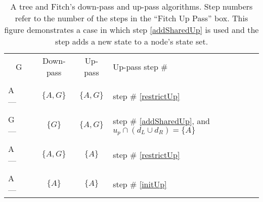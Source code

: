 \documentclass[11pt]{article}
\begin{document}
\begin{table}[htdp]
\caption{A tree and Fitch's down-pass and up-pass algorithms.  
Step numbers refer to the number of the steps in the ``Fitch Up Pass'' box.  This figure demonstrates a case in which step \ref{addSharedUp}  is used and the step adds a  new state to a node's state set. }
\begin{center}
\begin{tabular}{p{8mm}|p{7mm}c|c|l}
\multicolumn{2}{c}{G} & Down-pass & Up-pass & Up-pass step \# \\
& & & \\
A --- & &$\{A,G\}$ & $\{A,G\}$ & step \# \ref{restrictUp} \\
 & & & \\
G --- & & $\{G\}$ &$\{A,G\}$ & step \# \ref{addSharedUp}, and $u_p \cap (d_L \cup d_R) = \{A\}$  \\
& & & \\
A --- & &$\{A,G\}$ & $\{A\}$&  step \# \ref{restrictUp} \\
& & & \\
A --- & &$\{A\}$ & $\{A\}$&  step \# \ref{initUp} \\
\end{tabular}
\end{center}
\label{default}
\end{table}%
\end{document}

